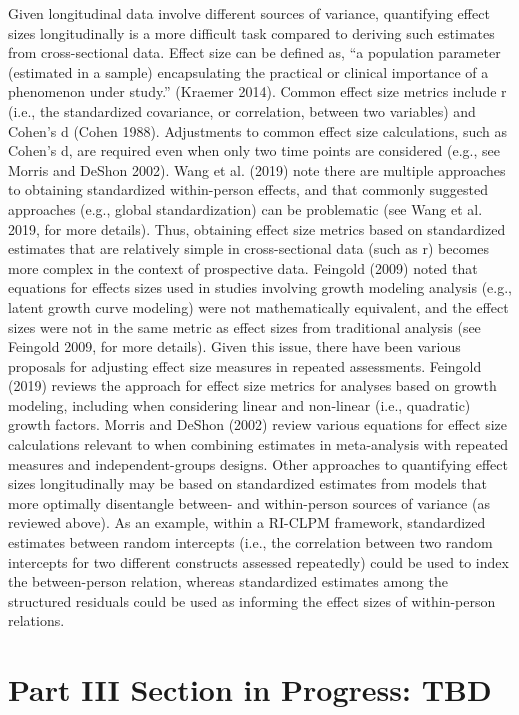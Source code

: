 \documentclass[
  letterpaper,
  DIV=11,
  numbers=noendperiod]{scrartcl}
\begin{document}
Given longitudinal data involve different sources of variance,
quantifying effect sizes longitudinally is a more difficult task
compared to deriving such estimates from cross-sectional data. Effect
size can be defined as, ``a population parameter (estimated in a sample)
encapsulating the practical or clinical importance of a phenomenon under
study.'' (Kraemer 2014). Common effect size metrics include r (i.e., the
standardized covariance, or correlation, between two variables) and
Cohen's d (Cohen 1988). Adjustments to common effect size calculations,
such as Cohen's d, are required even when only two time points are
considered (e.g., see Morris and DeShon 2002). Wang et al. (2019) note
there are multiple approaches to obtaining standardized within-person
effects, and that commonly suggested approaches (e.g., global
standardization) can be problematic (see Wang et al. 2019, for more
details). Thus, obtaining effect size metrics based on standardized
estimates that are relatively simple in cross-sectional data (such as r)
becomes more complex in the context of prospective data. Feingold (2009)
noted that equations for effects sizes used in studies involving growth
modeling analysis (e.g., latent growth curve modeling) were not
mathematically equivalent, and the effect sizes were not in the same
metric as effect sizes from traditional analysis (see Feingold 2009, for
more details). Given this issue, there have been various proposals for
adjusting effect size measures in repeated assessments. Feingold (2019)
reviews the approach for effect size metrics for analyses based on
growth modeling, including when considering linear and non-linear (i.e.,
quadratic) growth factors. Morris and DeShon (2002) review various
equations for effect size calculations relevant to when combining
estimates in meta-analysis with repeated measures and independent-groups
designs. Other approaches to quantifying effect sizes longitudinally may
be based on standardized estimates from models that more optimally
disentangle between- and within-person sources of variance (as reviewed
above). As an example, within a RI-CLPM framework, standardized
estimates between random intercepts (i.e., the correlation between two
random intercepts for two different constructs assessed repeatedly)
could be used to index the between-person relation, whereas standardized
estimates among the structured residuals could be used as informing the
effect sizes of within-person relations.

\hypertarget{part-iii-section-in-progress-tbd}{%
\section{Part III Section in Progress:
TBD}\label{part-iii-section-in-progress-tbd}}
\end{document}
